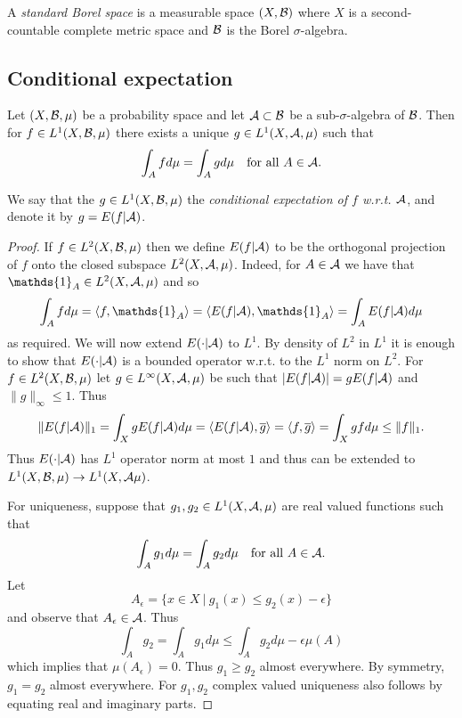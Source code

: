 \documentclass[twoside, a4paper, 10pt]{amsart}
\begin{document}
\begin{mydef} A \textit{standard Borel space} is a measurable space $(X,\mathcal{B})$ where $X$ is a second-countable complete metric space and $\mathcal{B}$ is the Borel $\sigma$-algebra.

\end{mydef}

\subsection{Conditional expectation}

\begin{thm} Let $(X, \mathcal{B}, \mu)$ be a probability space and let $\mathcal{A} \subset \mathcal{B}$ be a sub-$\sigma$-algebra of $\mathcal{B}$. Then for $f \in L^1(X,\mathcal{B},\mu)$ there exists a unique $g \in L^1(X,\mathcal{A},\mu)$ such that $$\int_A f d\mu = \int_A g d\mu \quad\text{for all } A\in \mathcal{A}.$$

\end{thm}

\begin{mydef} We say that the $g \in L^1(X,\mathcal{B},\mu)$ the \textit{conditional expectation of $f$ w.r.t. $\mathcal{A}$}, and denote it by $g = E(f|\mathcal{A})$.

\end{mydef}

\begin{proof} If $f \in L^2(X,\mathcal{B},\mu)$ then we define $E(f|\mathcal{A})$ to be the orthogonal projection of $f$ onto the closed subspace $L^2(X,\mathcal{A},\mu)$. Indeed, for $A \in \mathcal{A}$ we have that $\mathds{1}_A \in L^2(X, \cA,\mu)$ and so $$\int_A f d\mu = \langle f, \mathds{1}_A \rangle = \langle E(f|\cA), \mathds{1}_A \rangle = \int_A  E(f|\cA) d\mu$$ as required. We will now extend $E(\cdot |\mathcal{A})$ to $L^1$. By density of $L^2$ in $L^1$ it is enough to show that $E(\cdot |\mathcal{A})$ is a bounded operator w.r.t. to the $L^1$ norm on $L^2$. For $f \in L^2(X,\mathcal{B},\mu)$ let $g \in L^{\infty}(X,\mathcal{A},\mu)$ be such that $|E(f|\mathcal{A})| = gE(f|\mathcal{A})$ and $\|g\|_{\infty} \leq 1$. Thus $$\|E(f|\mathcal{A})\|_{1} = \int_X gE(f|\mathcal{A}) d\mu = \langle E(f|\mathcal{A}), \overline{g} \rangle = \langle f, \overline{g} \rangle = \int_X g f d\mu \leq \|f\|_1.$$ Thus $E(\cdot |\mathcal{A})$ has $L^1$ operator norm at most $1$ and thus can be extended to $L^1(X,\mathcal{B},\mu) \to L^1(X,\mathcal{A}\mu)$.

For uniqueness, suppose that $g_1,g_2 \in L^1(X,\mathcal{A},\mu)$ are real valued functions such that $$\int_A g_1 d\mu = \int_A g_2 d\mu \quad \text{for all } A \in \mathcal{A}.$$ Let $$A_{\epsilon} = \{x \in X ~|~ g_1(x) \leq g_2(x) - \epsilon \}$$ and observe that $A_{\epsilon} \in \mathcal{A}$. Thus $$\int_A g_2 = \int_A g_1 d\mu \leq \int_A g_2 d\mu - \epsilon \mu(A)$$ which implies that $\mu(A_{\epsilon}) = 0$. Thus $g_1 \geq g_2$ almost everywhere. By symmetry, $g_1=g_2$ almost everywhere. For $g_1,g_2$ complex valued uniqueness also follows by equating real and imaginary parts. 
\end{proof}
\end{document}
